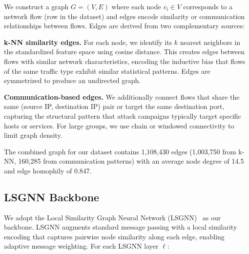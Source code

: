 \documentclass[conference]{IEEEtran}
\begin{document}
We construct a graph $G = (V, E)$ where each node $v_i \in V$ corresponds to a network flow (row in the dataset) and edges encode similarity or communication relationships between flows. Edges are derived from two complementary sources:

\textbf{k-NN similarity edges.} For each node, we identify its $k$ nearest neighbors in the standardized feature space using cosine distance. This creates edges between flows with similar network characteristics, encoding the inductive bias that flows of the same traffic type exhibit similar statistical patterns. Edges are symmetrized to produce an undirected graph.

\textbf{Communication-based edges.} We additionally connect flows that share the same (source IP, destination IP) pair or target the same destination port, capturing the structural pattern that attack campaigns typically target specific hosts or services. For large groups, we use chain or windowed connectivity to limit graph density.

The combined graph for our dataset contains 1{,}108{,}430 edges (1{,}003{,}750 from k-NN, 160{,}285 from communication patterns) with an average node degree of 14.5 and edge homophily of 0.847.

\subsection{LSGNN Backbone}

We adopt the Local Similarity Graph Neural Network (LSGNN)~\cite{wu2023lsgnn} as our backbone. LSGNN augments standard message passing with a local similarity encoding that captures pairwise node similarity along each edge, enabling adaptive message weighting. For each LSGNN layer $\ell$:
\end{document}
